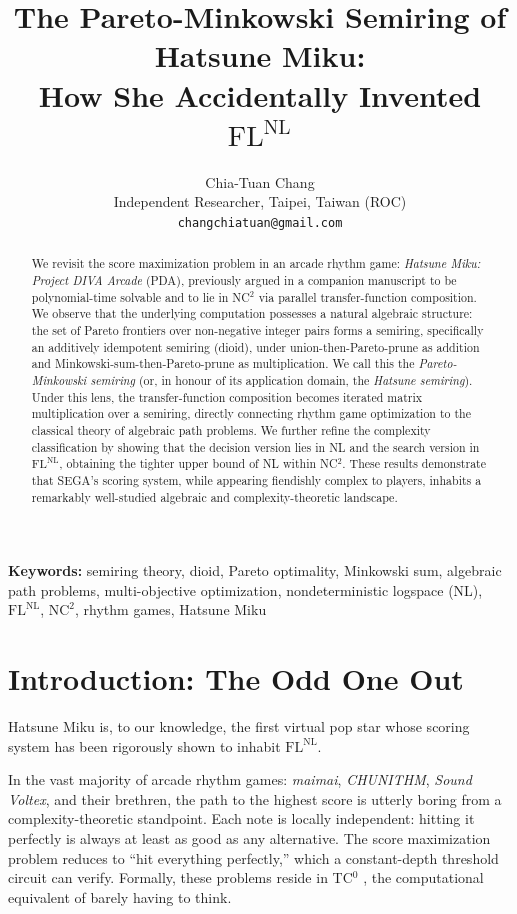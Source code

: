 \documentclass[11pt, letterpaper]{article}
\title{The Pareto-Minkowski Semiring of Hatsune Miku:\\
How She Accidentally Invented $\mathrm{FL^{NL}}$}
\author{Chia-Tuan Chang\\
\small Independent Researcher, Taipei, Taiwan (ROC)\\
\small \texttt{changchiatuan@gmail.com}}
\date{}
\theoremstyle{definition}
\theoremstyle{remark}
\begin{document}
\maketitle
\pagestyle{empty}
\thispagestyle{empty}

\begin{abstract}
We revisit the score maximization problem in an arcade rhythm game: \textit{Hatsune Miku: Project DIVA Arcade} (PDA), previously argued in a companion manuscript to be polynomial-time solvable and to lie in NC$^2$ via parallel transfer-function composition.
We observe that the underlying computation possesses a natural algebraic structure: the set of Pareto frontiers over non-negative integer pairs forms a semiring, specifically an additively idempotent semiring (dioid), under union-then-Pareto-prune as addition and Minkowski-sum-then-Pareto-prune as multiplication.
We call this the \emph{Pareto-Minkowski semiring} (or, in honour of its application domain, the \emph{Hatsune semiring}).
Under this lens, the transfer-function composition becomes iterated matrix multiplication over a semiring, directly connecting rhythm game optimization to the classical theory of algebraic path problems.
We further refine the complexity classification by showing that the decision version lies in NL and the search version in $\mathrm{FL^{NL}}$, obtaining the tighter upper bound of NL within NC$^2$.
These results demonstrate that SEGA's scoring system, while appearing fiendishly complex to players, inhabits a remarkably well-studied algebraic and complexity-theoretic landscape.
\end{abstract}

\smallskip
\noindent\textbf{Keywords:} semiring theory, dioid, Pareto optimality, Minkowski sum, algebraic path problems, multi-objective optimization, nondeterministic logspace (NL), $\mathrm{FL^{NL}}$, $\mathrm{NC}^2$, rhythm games, Hatsune Miku

\section{Introduction: The Odd One Out}

Hatsune Miku is, to our knowledge, the first virtual pop star whose scoring system has been rigorously shown to inhabit $\mathrm{FL^{NL}}$.

In the vast majority of arcade rhythm games: \textit{maimai}, \textit{CHUNITHM}, \textit{Sound Voltex}, and their brethren, the path to the highest score is utterly boring from a complexity-theoretic standpoint.
Each note is locally independent: hitting it perfectly is always at least as good as any alternative.
The score maximization problem reduces to ``hit everything perfectly,'' which a constant-depth threshold circuit can verify.
Formally, these problems reside in TC$^0$ \cite{Chang2026}, the computational equivalent of barely having to think.
\end{document}

